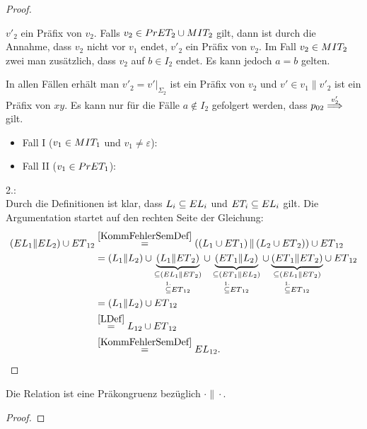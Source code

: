 \begin{proof}
\begin{itemize}
      $v'_2$ ein Präfix von $v_2$. Falls $v_2\in PrET _2\cup MIT _2$ gilt,
      dann ist durch die Annahme, dass $v_2$ nicht vor $v_1$ endet, $v'_2$ ein
      Präfix von $v_2$. Im Fall $v_2 \in MIT _2$ zwei man zusätzlich, dass
      $v_2$ auf $b\in I_2$ endet. Es kann jedoch $a=b$ gelten.
  \end{itemize}
  In allen Fällen erhält man $v'_2=v'|_{\Sigma _2}$ ist ein Präfix von $v_2$
  und $v'\in v_1\|v'_2$ ist ein Präfix von $xy$. Es kann nur für die Fälle
  $a\notin I_2$ gefolgert werden, dass $p_{02} \weakmust[v'_2]$ gilt.
  \begin{itemize}
    \item Fall I ($v_1\in MIT _1$ und $v_1\neq \varepsilon$): 
    \item Fall II ($v_1\in PrET _1$): 
  \end{itemize}

  2.:\\
  Durch die Definitionen ist klar, dass $L_i\subseteq EL _i$ und $ET
  _i\subseteq EL _i$ gilt. Die Argumentation startet auf den rechten Seite der
  Gleichung:
  \begin{align*}
    (EL{}_1\| EL{}_2)\cup
    ET{}_{12}&\overset{\ref{KommFehlerSemDef}}{=}\left(\left(L_1\cup
    ET{}_1\right)\|\left(L_2\cup ET{}_2\right)\right)\cup ET{}_{12}\\
    &=(L_1\|L_2) \cup \underset{\overset{1.}{\subseteq}
    ET{}_{12}}{\underset{\subseteq
    (EL{}_1\|ET{}_2)}{\underbrace{(L_1\|ET{}_2)}}} \cup
    \underset{\overset{1.}{\subseteq} ET{}_{12}}{\underset{\subseteq
    (ET{}_1\|EL{}_2)}{\underbrace{(ET{}_1\|L_2)}}} \cup
    \underset{\overset{1.}{\subseteq} ET{}_{12}}{\underset{\subseteq
    (EL{}_1\|ET{}_2)}{\underbrace{(ET{}_1\|ET{}_2)}}} \cup ET{}_{12}\\
    &=(L_1\|L_2) \cup ET{}_{12}\\
    &\overset{\ref{LDef}}{=}L_{12}\cup ET{}_{12}\\
    &\overset{\ref{KommFehlerSemDef}}{=}EL{}_{12}.
  \end{align*}
\end{proof}

\begin{Kor}
  Die Relation \ERel{} ist eine Präkongruenz bezüglich $\cdot\|\cdot$.
\end{Kor}
\begin{proof}
\end{proof}


